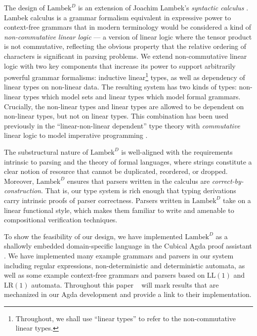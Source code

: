 \documentclass[acmsmall,nonacm]{acmart}
\newcommand{\theoryabbv}{$\textrm{Lambek}^D$\xspace}
\newcommand{\LLL}{\textrm{LL}}
\newcommand{\LRR}{\textrm{LR}}
\newcommand{\LL}[1]{\LLL(#1)}
\newcommand{\LR}[1]{\LRR(#1)}
\newcommand{\agdalogo}{%
  \usebox{\logoagdabox}}%
\newcommand{\zenodolink}{https://zenodo.org/records/15049780}
\newcommand{\Agda}{\href{\zenodolink}{\agdalogo}}
\begin{document}
The design of \theoryabbv
is an extension of Joachim Lambek's \emph{syntactic calculus}
\cite{lambek58}. Lambek calculus is a grammar formalism equivalent
in expressive power to context-free grammars that in modern
terminology would be considered a kind of \emph{non-commutative linear
logic} --- a version of linear logic where the tensor product is not
commutative, reflecting the obvious property that the relative
ordering of characters is significant in parsing problems. We extend
non-commutative linear logic with two key components that increase its
power to support arbitrarily powerful grammar formalisms: inductive
linear\footnote{Throughout, we shall use ``linear types'' to refer to the
non-commutative linear types.} types, as well as dependency of linear types on non-linear
data. The resulting system has two kinds of types: non-linear types
which model sets and linear types which model formal
grammars. Crucially, the non-linear types and linear types are allowed
to be dependent on non-linear types, but not on linear types. This
combination has been used previously in the ``linear-non-linear
dependent'' type theory with \emph{commutative} linear logic to model
imperative programming \cite{krishnaswami_integrating_2015}.

The substructural nature of \theoryabbv is well-aligned with the
requirements intrinsic to parsing and the theory of formal
languages, where strings constitute a clear notion of resource
that cannot be duplicated, reordered, or dropped. Moreover, \theoryabbv ensures that parsers written in the calculus are \emph{correct-by-construction}. That is, our type system is rich
enough that typing derivations carry intrinsic proofs of parser correctness.
Parsers written in \theoryabbv take on a linear functional style, which makes
them familiar to write and amenable to compositional verification techniques.

To show the feasibility of our design, we have implemented \theoryabbv
as a shallowly embedded domain-specific language in the Cubical Agda
proof assistant \cite{VezzosiMortbergAbel2019}. We have implemented many example
grammars and parsers in our system including regular expressions,
non-deterministic and deterministic automata, as well as some example
context-free grammars and parsers based on $\LL{1}$ and $\LR{1}$
automata. Throughout this paper \Agda~ will mark
results that are mechanized in our Agda development and provide a link to their
implementation.
\end{document}
